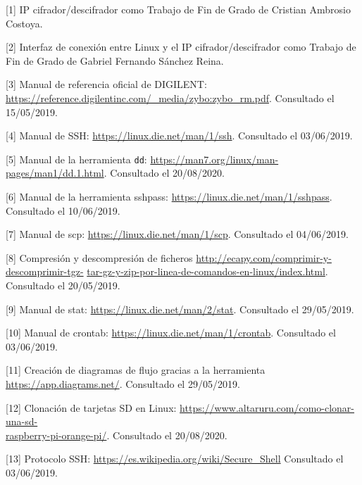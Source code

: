 \hspace{0.5cm}	[\hypertarget{1}{1}] IP cifrador/descifrador como Trabajo de Fin de Grado de Cristian Ambrosio Costoya. %

\hspace{0.5cm}	[\hypertarget{2}{2}] Interfaz de conexión entre Linux y el IP cifrador/descifrador como Trabajo de Fin de Grado de Gabriel Fernando Sánchez Reina. %

\hspace{0.5cm}	[\hypertarget{3}{3}] Manual de referencia oficial de DIGILENT: \url{https://reference.digilentinc.com/_media/zybo:zybo_rm.pdf}. Consultado el 15/05/2019.

\hspace{0.5cm}	[\hypertarget{4}{4}] Manual de SSH: \url{https://linux.die.net/man/1/ssh}. Consultado el 03/06/2019.

\hspace{0.5cm}	[\hypertarget{5}{5}] Manual de la herramienta \texttt{dd}: \url{https://man7.org/linux/man-pages/man1/dd.1.html}. Consultado el 20/08/2020.

\hspace{0.5cm}	[\hypertarget{6}{6}] Manual de la herramienta sshpass: \url{https://linux.die.net/man/1/sshpass}. Consultado el 10/06/2019.

\hspace{0.5cm}	[\hypertarget{7}{7}] Manual de scp: \url{https://linux.die.net/man/1/scp}. Consultado el 04/06/2019.

\hspace{0.5cm}	[\hypertarget{8}{8}] Compresión y descompresión de ficheros \url{http://ecapy.com/comprimir-y-descomprimir-tgz-} \url{tar-gz-y-zip-por-linea-de-comandos-en-linux/index.html}. Consultado el 20/05/2019.

\hspace{0.5cm}	[\hypertarget{9}{9}] Manual de stat: \url{https://linux.die.net/man/2/stat}. Consultado el 29/05/2019.

\hspace{0.5cm}	[\hypertarget{10}{10}] Manual de crontab: \url{https://linux.die.net/man/1/crontab}. Consultado el 03/06/2019.
	
\hspace{0.5cm}	[\hypertarget{11}{11}] Creación de diagramas de flujo gracias a la herramienta \url{https://app.diagrams.net/}. Consultado el 29/05/2019.
	
\hspace{0.5cm}	[\hypertarget{12}{12}] Clonación de tarjetas SD en Linux: \url{https://www.altaruru.com/como-clonar-una-sd-}\\
	\url{raspberry-pi-orange-pi/}. Consultado el 20/08/2020.

\hspace{0.5cm}	[\hypertarget{13}{13}] Protocolo SSH: \url{https://es.wikipedia.org/wiki/Secure_Shell} Consultado el 03/06/2019.
